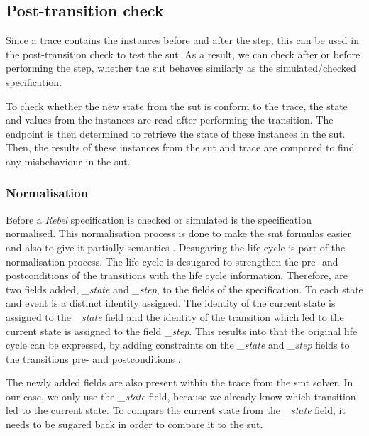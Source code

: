 \subsection{Post-transition check}

Since a trace contains the instances before and after the step, this can be used
in the post-transition check to test the \gls{sut}. As a result, we can check after or
before performing the step, whether the \gls{sut} behaves similarly as the
simulated/checked specification.

To check whether the new state from the \gls{sut} is
conform to the trace, the state and values from the instances are read after
performing the transition. The endpoint is then determined to retrieve the state
of these instances in the \gls{sut}. Then, the results of these instances from the \gls{sut}
and trace are compared to find any misbehaviour in the \gls{sut}.

\subsubsection{Normalisation}

Before a \textit{Rebel} specification is checked or simulated is the specification
normalised. This normalisation process is done to make the \gls{smt} formulas easier
and also to give it partially semantics
\cite[p.5]{stoel_storm_vinju_bosman_2016}. Desugaring the life cycle is part of
the normalisation process. The life cycle is desugared to strengthen the pre-
and postconditions of the transitions with the life cycle information.
Therefore, are two fields added, \textit{\_state} and \textit{\_step}, to the fields of the
specification. To each state and event is a distinct identity assigned. The
identity of the current state is assigned to the \textit{\_state} field and the identity
of the transition which led to the current state is assigned to the field
\textit{\_step}. This results into that the original life cycle can be expressed, by
adding constraints on the \textit{\_state} and \textit{\_step} fields to the transitions pre- and
postconditions \cite[p.5]{stoel_storm_vinju_bosman_2016}.

The newly added fields
are also present within the trace from the \gls{smt} solver. In our case, we only use
the \textit{\_state} field, because we already know which transition led to the current
state. To compare the current state from the \textit{\_state} field, it needs to be
sugared back in order to compare it to the \gls{sut}.

